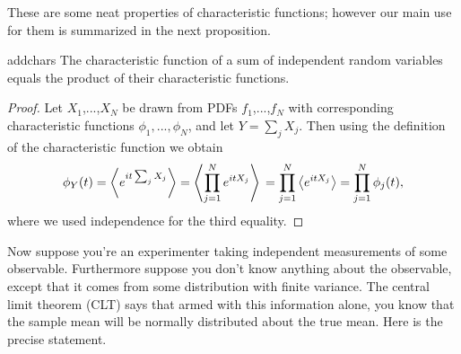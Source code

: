 These are some neat properties of characteristic functions; however
our main use for them is summarized in the next proposition.
\begin{proposition}{}{addchars}
  The characteristic function of a sum of independent random variables equals 
  the product of their characteristic functions.
  \begin{proof}
    Let $X_1$,...,$X_N$ be drawn from PDFs $f_1$,...,$f_N$ with
    corresponding characteristic functions $\phi_1,...,\phi_N$, and
    let $Y=\sum_j X_j$. Then using the definition of the characteristic
    function we obtain
    $$
      \phi_Y(t)=\ev{e^{it\sum_j X_j}}=\ev{\prod_{j=1}^N e^{it X_j}}\\
               =\prod_{j=1}^N \ev{e^{it X_j}}=\prod_{j=1}^N\phi_j(t),
    $$
    where we used independence for the third equality.
  \end{proof}
\end{proposition}
Now suppose you're an experimenter taking independent measurements of 
some observable. Furthermore suppose you don't know anything about the 
observable, except that it comes from some distribution with finite variance.
The central limit theorem (CLT) says that armed with this information alone, 
you know that the sample mean will be normally distributed about
the true mean. Here is the precise statement. 

